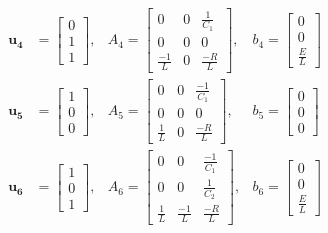 \begin{equation}
\begin{matrix}
        \mathbf{u_4} &= \left[ \begin{array}{ccc} 0 \\ 1 \\ 1 \end{array} \right],
        &
        A_4 = \left[ \begin{array}{ccc} 
            0 & 0 & \frac{1}{C_1} \\ 
            0 & 0 & 0 \\ 
            \frac{-1}{L} & 0 & \frac{-R}{L} 
        \end{array} \right],
        &
        b_4 = \left[ \begin{array}{c} 0 \\ 0 \\ \frac{E}{L} \end{array} \right] \\
        \mathbf{u_5} &= \left[ \begin{array}{ccc} 1 \\ 0 \\ 0 \end{array} \right],
        &
        A_5 = \left[ \begin{array}{ccc} 
            0 & 0 & \frac{-1}{C_1} \\
            0 & 0 & 0 \\
            \frac{1}{L} & 0 & \frac{-R}{L} 
        \end{array} \right],
        &
        b_5 = \left[ \begin{array}{c} 0 \\ 0 \\ 0 \end{array} \right] \\
        \mathbf{u_6} &= \left[ \begin{array}{ccc} 1 \\ 0 \\ 1 \end{array} \right],
        &
        A_6 = \left[ \begin{array}{ccc} 
            0 & 0 & \frac{-1}{C_1} \\
            0 & 0 & \frac{1}{C_2} \\
            \frac{1}{L} & \frac{-1}{L} & \frac{-R}{L} 
        \end{array} \right],
        &
        b_6 = \left[ \begin{array}{c} 0 \\ 0 \\ \frac{E}{L} \end{array} \right] \\

\end{matrix}
\end{equation}
